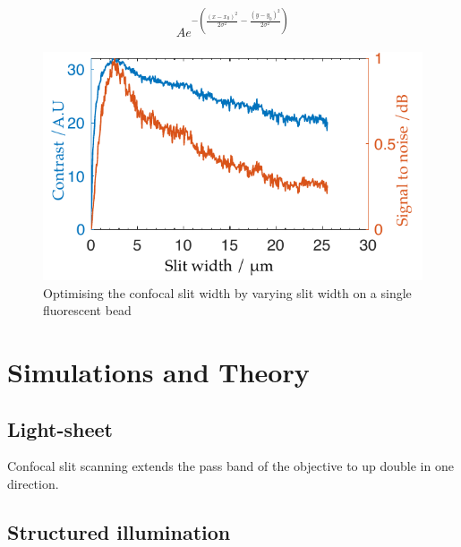 \begin{align}
  A e^{-\left(\frac{(x-x_0)^2}{2\sigma^2}-\frac{(y-y_0)^2}{2\sigma^2}\right)}
\end{align}

\begin{figure}
  \centering
  \includegraphics{Chapters/dualslit/Figs/PDF/optimal_slit_snr_contrast}
  \caption{Optimising the confocal slit width by varying slit width on a single fluorescent bead}
  \label{fig:optimal_slit_snr_contrast}
\end{figure}

%  
%  

\section{Simulations and Theory}
\subsection{Light-sheet}

Confocal slit scanning extends the pass band of the objective to up double in one direction.

\subsection{Structured illumination}

